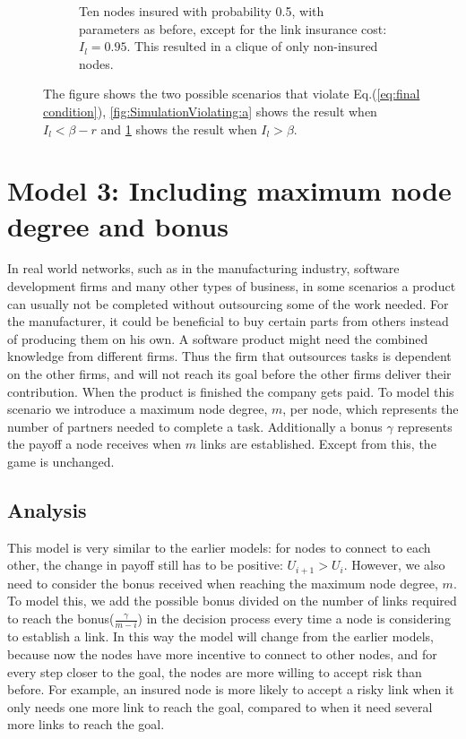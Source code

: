 \begin{figure}[h]
\begin{subfigure}{0.9\textwidth}
\caption{\label{fig:SimulationViolating:b} Ten nodes insured with probability 0.5, with parameters as before, except for the link insurance cost: $I_{l}=0.95$. This resulted in a clique of only non-insured nodes. }
\end{subfigure}
\caption{\label{fig:SimulationViolating} The figure shows the two possible scenarios that violate Eq.(\ref{eq:final condition}), \ref{fig:SimulationViolating:a} shows the result when $I_{l}<\beta-r$ and \ref{fig:SimulationViolating:b} shows the result when $I_{l}>\beta$.}
\end{figure}




\section{Model 3: Including maximum node degree and bonus}
In real world networks, such as in the manufacturing industry, software development firms and many other types of business, in some scenarios a product can usually not be completed without outsourcing some of the work needed. For the manufacturer, it could be beneficial to buy certain parts from others instead of producing them on his own. A software product might need the combined knowledge from different firms. Thus the firm that outsources tasks is dependent on the other firms, and will not reach its goal before the other firms deliver their contribution. When the product is finished the company gets paid.
To model this scenario we introduce a maximum node degree, $m$, per node, which represents the number of partners needed to complete a task. Additionally a bonus $\gamma$ represents the payoff a node receives when $m$ links are established. Except from this, the game is unchanged.
\subsection{Analysis}
This model is very similar to the earlier models: for nodes to connect to each other, the change in payoff still has to be positive: $U_{i+1} > U_{i}$. However, we also need to consider the bonus received when reaching the maximum node degree, $m$. 
To model this, we add the possible bonus divided on the number of links required to reach the bonus($\frac{\gamma}{m-i}$) in the decision process every time a node is considering to establish a link. 
In this way the model will change from the earlier models, because now the nodes have more incentive to connect to other nodes, and for every step closer to the goal, the nodes are more willing to accept risk than before. For example, an insured node is more likely to accept a risky link when it only needs one more link to reach the goal, compared to when it need several more links to reach the goal.

